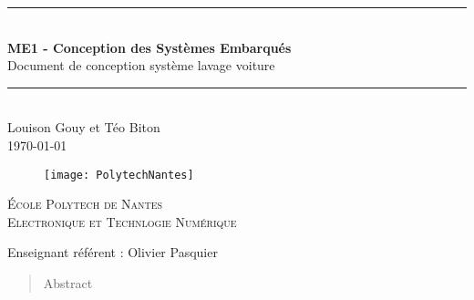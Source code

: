 \newcommand{\HRule}{\rule{\linewidth}{0.5mm}} %

\vspace*{1cm}

\begin{center} %
	\HRule \\[0.2cm] %
	\Large
	\textbf{
		ME1 - Conception des Systèmes Embarqués
		}\\ %
	\vspace{1cm}
Document de conception système lavage voiture \\

	\large
	\HRule \\[1.5cm] %
	\normalsize
	Louison Gouy et Téo Biton\\
	\today %
\end{center}

\begin{figure}[H] %
	\centering
	\texttt{[image: PolytechNantes]}
\end{figure}

\vspace{2cm}

\begin{center}\large %
	\textsc{École Polytech de Nantes}\\
	\textsc{Electronique et Technlogie Numérique}
\end{center}

\vspace{2cm}

\noindent
Enseignant référent : Olivier Pasquier
\vspace{2cm}

\begin{abstract}
Abstract
\end{abstract}

